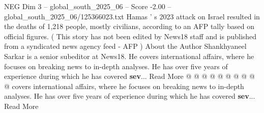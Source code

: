 \begin{textsample}{NEG Dim 3 – global\_south\_2025\_06 – Score -2.00 – global\_south\_2025\_06/125366023.txt}
Hamas ' s 2023 attack on Israel resulted in the deaths of 1,218 people, mostly civilians, according to an AFP tally based on official figures. ( This story has not been edited by News18 staff and is published from a syndicated news agency feed - AFP ) About the Author Shankhyaneel Sarkar is a senior subeditor at News18.
He covers international affairs, where he focuses on breaking news to in-depth analyses.
He has over five years of experience during which he has covered \textbf{sev}...
Read More @ @ @ @ @ @ @ @ @ @ covers international affairs, where he focuses on breaking news to in-depth analyses.
He has over five years of experience during which he has covered \textbf{sev}...
Read More

\end{textsample}
